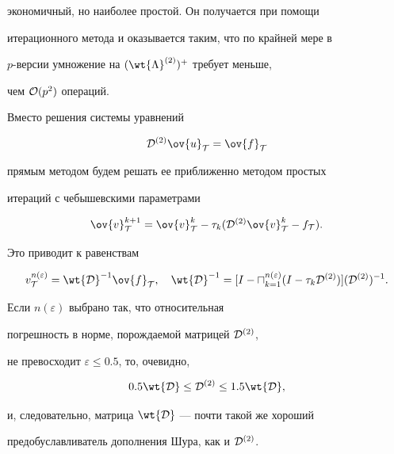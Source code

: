 экономичный, но наиболее простой. Он получается при помощи 


итерационного метода и оказывается таким, что по крайней мере в 


$p$-версии умножение на $(\wt{\Lambda}^{(2)})^+$ требует меньше, 


чем ${\cal O} (p^2)$ операций. 


Вместо решения системы уравнений 


$$


{\cal D}^{(2)} \ov{u}_{\cal T} = \ov{f}_{\cal T}


$$


прямым методом будем решать ее приближенно методом простых 


итераций с чебышевскими параметрами 


$$


\ov{v}^{k+1}_{\cal T} = \ov{v}^k_{\cal T} - \tau_k ({\cal


D}^{(2)}\ov{v}^k_{\cal T} - f_{\cal T}).


$$


Это приводит к равенствам


$$


v^{n(\varepsilon)}_{\cal T} = \wt{{\cal D}}^{-1} \ov{f}_{\cal T},


\quad \wt{\cal D}^{-1} = [I - \sqcap^{n(\varepsilon)}_{k=1} (I-\tau_k {\cal


D}^{(2)})]({\cal D}^{(2)})^{-1}.


$$


Если $n(\varepsilon)$ выбрано так, что относительная 


погрешность в норме, порождаемой матрицей ${\cal D}^{(2)}$, 


не превосходит $\varepsilon \leq 0.5$, то, очевидно, 


\begin{equation}\label{eq6.23}


0.5 \wt{{\cal D}} \leq {\cal D}^{(2)} \leq 1.5 \wt{{\cal D}},


\end{equation}


и, следовательно, матрица $\wt{{\cal D}}$ --- почти такой же хороший 


предобуславливатель дополнения Шура, как и ${\cal D}^{(2)}$.





